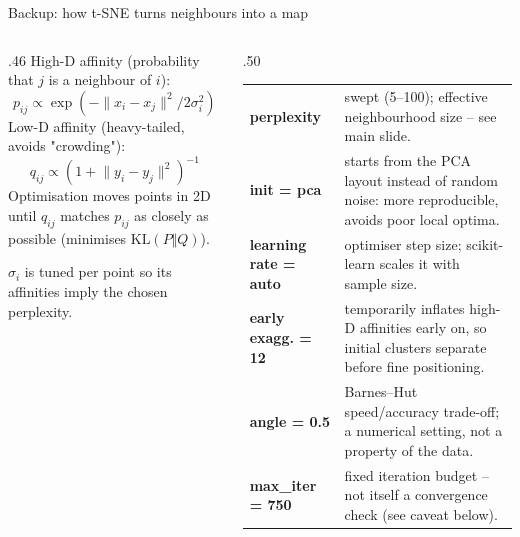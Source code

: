 \documentclass[aspectratio=169,10pt]{beamer}
\begin{document}
\begin{frame}{Backup: how t-SNE turns neighbours into a map}
  \begin{columns}[T,onlytextwidth]
  \begin{column}{.46\textwidth}
    \setlength{\abovedisplayskip}{2pt}\setlength{\belowdisplayskip}{2pt}
    High-D affinity (probability that $j$ is a neighbour of $i$):
    \[p_{ij}\propto\exp(-\lVert x_i-x_j\rVert^2/2\sigma_i^2)\]
    Low-D affinity (heavy-tailed, avoids "crowding"):
    \[q_{ij}\propto(1+\lVert y_i-y_j\rVert^2)^{-1}\]
    Optimisation moves points in 2D until $q_{ij}$ matches $p_{ij}$ as closely as possible (minimises $\mathrm{KL}(P\Vert Q)$).\par\smallskip
    $\sigma_i$ is tuned per point so its affinities imply the chosen perplexity.
  \end{column}
  \begin{column}{.50\textwidth}
    \footnotesize
    \begin{tabular}{lp{}}\toprule
      \textbf{perplexity} & swept (5--100); effective neighbourhood size -- see main slide.\\
      \textbf{init = pca} & starts from the PCA layout instead of random noise: more reproducible, avoids poor local optima.\\
      \textbf{learning rate = auto} & optimiser step size; scikit-learn scales it with sample size.\\
      \textbf{early exagg. = 12} & temporarily inflates high-D affinities early on, so initial clusters separate before fine positioning.\\
      \textbf{angle = 0.5} & Barnes--Hut speed/accuracy trade-off; a numerical setting, not a property of the data.\\
      \textbf{max\_iter = 750} & fixed iteration budget -- not itself a convergence check (see caveat below).\\\bottomrule
    \end{tabular}
  \end{column}
  \end{columns}
\end{frame}
\end{document}
